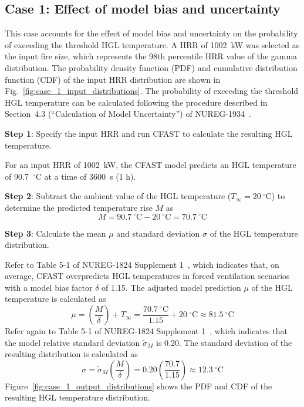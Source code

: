 \documentclass[12pt]{article}
\begin{document}
\clearpage

\subsection{Case 1: Effect of model bias and uncertainty}

This case accounts for the effect of model bias and uncertainty on the probability of exceeding the threshold HGL temperature. A HRR of 1002~kW was selected as the input fire size, which represents the 98th percentile HRR value of the gamma distribution. The probability density function (PDF) and cumulative distribution function (CDF) of the input HRR distribution are shown in Fig.~\ref{fig:case_1_input_distributions}. The probability of exceeding the threshold HGL temperature can be calculated following the procedure described in Section~4.3 (``Calculation of Model Uncertainty'') of NUREG-1934~\cite{NUREG_1934}.

\textbf{Step 1}: Specify the input HRR and run CFAST to calculate the resulting HGL temperature.

For an input HRR of 1002~kW, the CFAST model predicts an HGL temperature of 90.7~$^\circ$C at a time of 3600~s (1 h).

\textbf{Step 2}: Subtract the ambient value of the HGL temperature ($T_\infty = 20~^\circ$C) to determine the predicted temperature rise $M$ as
\begin{equation}
M = 90.7~^\circ\textrm{C} - 20~^\circ\textrm{C} = 70.7~^\circ\textrm{C}
\end{equation}

\textbf{Step 3}: Calculate the mean $\mu$ and standard deviation $\sigma$ of the HGL temperature distribution.

Refer to Table 5-1 of NUREG-1824 Supplement 1~\cite{NUREG_1824_Sup_1}, which indicates that, on average, CFAST overpredicts HGL temperatures in forced ventilation scenarios with a model bias factor $\delta$ of 1.15. The adjusted model prediction $\mu$ of the HGL temperature is calculated as
\begin{equation}
\mu = \left( \frac{M}{\delta} \right) + T_\infty = \frac{70.7~^\circ\textrm{C}}{1.15} + 20~^\circ\textrm{C} \approx 81.5~^\circ\textrm{C}
\end{equation}
Refer again to Table 5-1 of NUREG-1824 Supplement 1~\cite{NUREG_1824_Sup_1}, which indicates that the model relative standard deviation $\widetilde\sigma_M$ is 0.20. The standard deviation of the resulting distribution is calculated as
\begin{equation}
\sigma = \widetilde\sigma_M \left( \frac{M}{\delta} \right) = 0.20 \left( \frac{70.7}{1.15} \right) \approx 12.3~^\circ\textrm{C}
\end{equation}
Figure~\ref{fig:case_1_output_distributions} shows the PDF and CDF of the resulting HGL temperature distribution.
\end{document}
